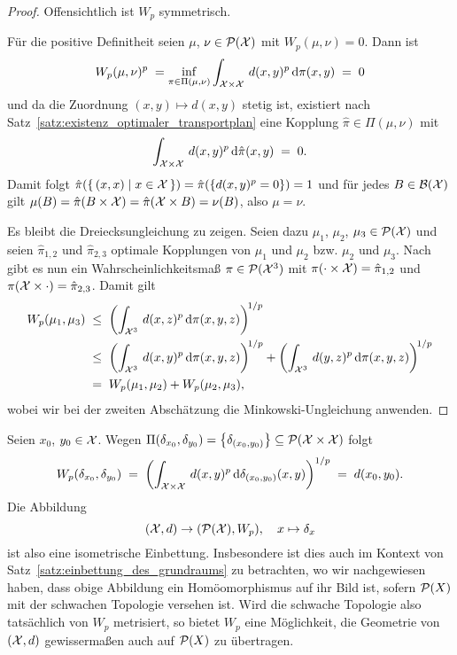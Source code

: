 \documentclass[../thesis/thesis.tex]{subfiles}
\begin{document}
	\begin{proof}
		Offensichtlich ist $W_p$ symmetrisch.
		
		Für die positive Definitheit seien $\mu$, $\nu \in \mathcal{P}(\mathcal{X})$ mit $W_p(\mu, \nu) = 0$. Dann ist
		\[ W_p(\mu, \nu)^p \; = \inf_{\pi \in \Pi(\mu, \nu)} \int_{\mathcal{X} \times \mathcal{X}} \, d(x, y)^p \, \mathrm{d}\pi(x, y) \; = \; 0 \]
		und da die Zuordnung $(x, y) \mapsto d(x, y)$ stetig ist, existiert nach Satz~\ref{satz:existenz_optimaler_transportplan} eine Kopplung $\hat{\pi} \in \Pi(\mu, \nu)$ mit
		\[ \int_{\mathcal{X} \times \mathcal{X}} \, d(x, y)^p \, \mathrm{d}\hat{\pi}(x, y) \; = \; 0 \text{.} \]
		Damit folgt $\hat{\pi}(\left\{\, (x, x) \; \middle| \; x \in \mathcal{X} \,\right\}) = \hat{\pi}(\left\{d(x, y)^p = 0\right\}) = 1$ und für jedes $B \in \mathcal{B}(\mathcal{X})$ gilt
		$\mu(B) = \hat{\pi}(B \times \mathcal{X}) = \hat{\pi}(\mathcal{X} \times B) = \nu(B)$, also $\mu = \nu$.
		
		Es bleibt die Dreiecksungleichung zu zeigen. Seien dazu $\mu_1$, $\mu_2$, $\mu_3 \in \mathcal{P}(\mathcal{X})$ und seien $\hat{\pi}_{1, 2}$ und $\hat{\pi}_{2, 3}$ optimale Kopplungen von
		$\mu_1$ und $\mu_2$ bzw. $\mu_2$ und $\mu_3$. Nach \cite[S. 11-12]{Villani.2009} gibt es nun ein Wahrscheinlichkeitsmaß $\pi \in \mathcal{P}(\mathcal{X}^3)$ mit 
		$\pi(\cdot \times \mathcal{X}) = \hat{\pi}_{1, 2}$ und $\pi(\mathcal{X} \times \cdot) = \hat{\pi}_{2, 3}$. Damit gilt
		\begin{align*}
			W_p(\mu_1, \mu_3) \; &\leq \; \left(\int_{\mathcal{X}^3} \, d(x, z)^p \, \mathrm{d}\pi(x, y, z)\right)^{\! 1/p} \\
			                     &\leq \; \left(\int_{\mathcal{X}^3} \, d(x, y)^p \, \mathrm{d}\pi(x, y, z)\right)^{\! 1/p} + \left(\int_{\mathcal{X}^3} \, d(y, z)^p \, \mathrm{d}\pi(x, y, z)\right)^{\! 1/p} \\
			                     &=    \; W_p(\mu_1, \mu_2) + W_p(\mu_2, \mu_3) \text{,}
		\end{align*}
		wobei wir bei der zweiten Abschätzung die Minkowski-Ungleichung anwenden.
	\end{proof}

	\begin{Bemerkung}
		Seien $x_0$, $y_0 \in \mathcal{X}$. Wegen $\Pi(\delta_{x_0}, \delta_{y_0}) = \left\{\delta_{(x_0, y_0)}\right\} \subseteq \mathcal{P}(\mathcal{X} \times \mathcal{X})$ folgt
		\[ W_p(\delta_{x_0}, \delta_{y_0}) \; = \; \left( \int_{\mathcal{X} \times \mathcal{X}} \, d(x, y)^p \, \mathrm{d}\delta_{(x_0, y_0)}(x, y) \right)^{1/p} \; = \; d(x_0, y_0) \text{.} \]
		Die Abbildung 
		\[ (\mathcal{X}, d) \to (\mathcal{P}(\mathcal{X}), W_p), \quad x \mapsto \delta_x \]
		ist also eine isometrische Einbettung. Insbesondere ist dies auch im Kontext von Satz~\ref{satz:einbettung_des_grundraums} zu betrachten, wo wir nachgewiesen haben, dass obige Abbildung ein Homöomorphismus auf 
		ihr Bild ist, sofern $\mathcal{P}(X)$ mit der schwachen Topologie versehen ist. Wird die schwache Topologie also tatsächlich von $W_p$ metrisiert, so bietet $W_p$ eine Möglichkeit, die Geometrie von $(\mathcal{X}, d)$ gewissermaßen auch auf $\mathcal{P}(X)$ zu übertragen.
	\end{Bemerkung}
\end{document}
